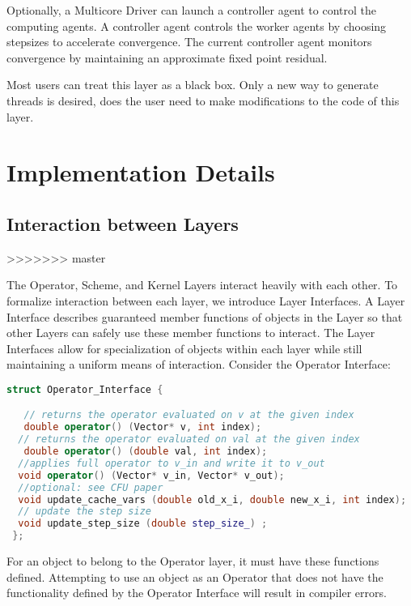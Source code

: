 Optionally, a Multicore Driver can launch a controller agent to control the computing agents.
A controller agent controls the worker agents by choosing stepsizes to accelerate convergence.
The current controller agent monitors convergence by maintaining an approximate fixed point residual.

Most users can treat this layer as a black box. Only a new way to generate threads is desired, does the user need to make modifications to the code of this layer.

\section{Implementation Details}

\subsection{Interaction between Layers}
>>>>>>> master

The Operator, Scheme, and Kernel Layers interact heavily with each other. To formalize interaction between each layer, we introduce Layer Interfaces. A Layer Interface describes guaranteed member functions of objects in the Layer so that other Layers can safely use these member functions to interact. The Layer Interfaces allow for specialization of objects within each layer while still maintaining a uniform means of interaction. Consider the Operator Interface:
\begin{lstlisting}[language=C++,label={Operator_Interface}]
struct Operator_Interface {

   // returns the operator evaluated on v at the given index
   double operator() (Vector* v, int index);
  // returns the operator evaluated on val at the given index
   double operator() (double val, int index);
  //applies full operator to v_in and write it to v_out
  void operator() (Vector* v_in, Vector* v_out);
  //optional: see CFU paper
  void update_cache_vars (double old_x_i, double new_x_i, int index);
  // update the step size
  void update_step_size (double step_size_) ;
 };
\end{lstlisting}

For an object to belong to the Operator layer, it must have these functions defined.
Attempting to use an object as an Operator that does not have the functionality defined by the Operator Interface will result in compiler errors.

